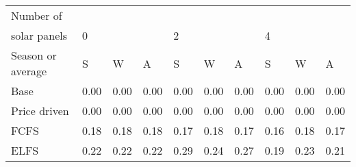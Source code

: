 \begin{table}[h] 
\centering 
\begin{tabular}{l|lll|lll|lll}Number of \\ solar panels&0& & &2& & &4& & \\ \hline 
Season or average & S & W & A & S & W & A & S & W & A \\ \hline 
Base&0.00&0.00&0.00&0.00&0.00&0.00&0.00&0.00&0.00 \\ 
Price driven&0.00&0.00&0.00&0.00&0.00&0.00&0.00&0.00&0.00 \\ 
FCFS&0.18&0.18&0.18&0.17&0.18&0.17&0.16&0.18&0.17 \\ 
ELFS&0.22&0.22&0.22&0.29&0.24&0.27&0.19&0.23&0.21 \\ 
\end{tabular} 
\end{table}